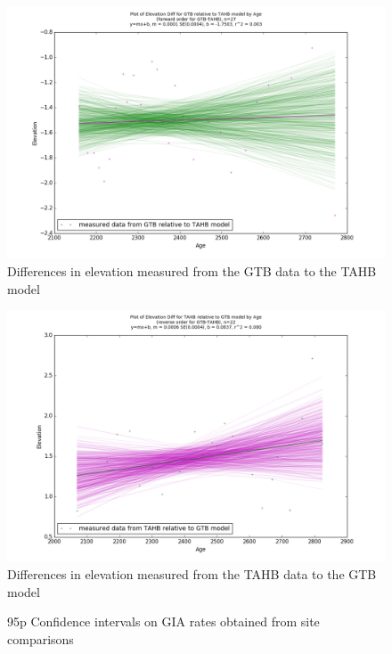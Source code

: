 \begin{figure}[h]
	\includegraphics[width=0.9\linewidth]{data/bothNonZero/withinSeventyFivePercent/gias/theGIA_GTB_relative_to_TAHB.png}
	\caption{Differences in elevation measured from the GTB data to the TAHB model}
	\label{fig:gias_GTBxTAHB}
\end{figure}
\newpage


\begin{figure}[h]
	\includegraphics[width=0.9\linewidth]{data/bothNonZero/withinSeventyFivePercent/gias/theGIA_TAHB_relative_to_GTB.png}
	\caption{Differences in elevation measured from the TAHB data to the GTB model}
	\label{fig:gias_TAHBxGTB}
\end{figure}
\newpage


\begin{figure}[h]
	\caption{95p Confidence intervals on GIA rates obtained from site comparisons}
	\label{fig:intervalsGIA}
\end{figure}


\newpage

